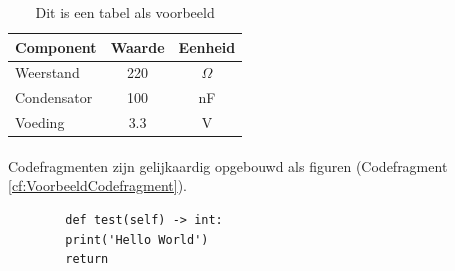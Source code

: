 \begin{table}[H]
    \centering
    \captionsetup{width=0.8\textwidth}
    \begin{tabular}{lcc}
        \toprule
        \textbf{Component} & \textbf{Waarde} & \textbf{Eenheid} \\
        \midrule
        Weerstand & 220 & $\Omega$ \\
        Condensator & 100 & nF \\
        Voeding & 3.3 & V \\
        \bottomrule
    \end{tabular}
    \caption[Voorbeeld tabel (naam voor lijst van tabellen)]{Dit is een tabel als voorbeeld}
    \label{tab:VoorbeeldTabel}
\end{table}

\paragraph{}%
\label{ssec:codefragmenten}

Codefragmenten zijn gelijkaardig opgebouwd als figuren (Codefragment \ref{cf:VoorbeeldCodefragment}).

\begin{listing}[H]
    \begin{verbatim}
        def test(self) -> int:
        print('Hello World')
        return
    \end{verbatim}
    \caption[Voorbeeld codefragment]{Dit is een codefragment als voorbeeld}
    \label{cf:VoorbeeldCodefragment}
\end{listing}

